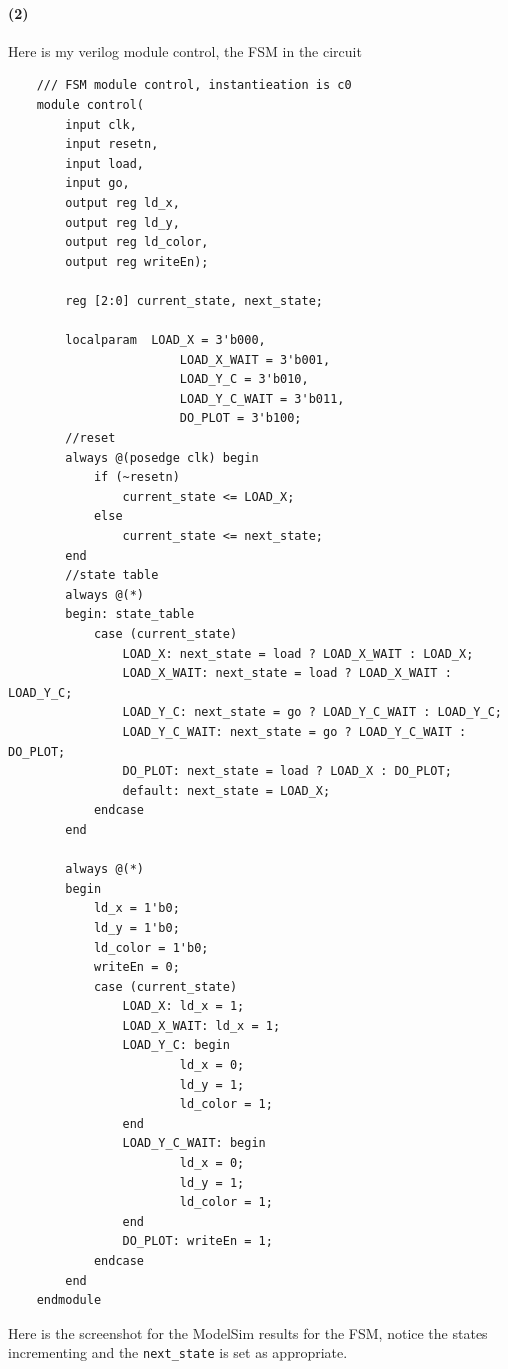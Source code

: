 \documentclass{article}
\begin{document}
\paragraph{(2)} Here is my verilog module control, the FSM in the circuit
\begin{verbatim}
    /// FSM module control, instantieation is c0
    module control(
        input clk, 
        input resetn, 
        input load, 
        input go,
        output reg ld_x, 
        output reg ld_y, 
        output reg ld_color, 
        output reg writeEn);

        reg [2:0] current_state, next_state;

        localparam  LOAD_X = 3'b000,
                        LOAD_X_WAIT = 3'b001,
                        LOAD_Y_C = 3'b010,
                        LOAD_Y_C_WAIT = 3'b011,
                        DO_PLOT = 3'b100;
        //reset
        always @(posedge clk) begin
            if (~resetn)
                current_state <= LOAD_X;
            else
                current_state <= next_state;
        end
        //state table
        always @(*) 
        begin: state_table
            case (current_state)
                LOAD_X: next_state = load ? LOAD_X_WAIT : LOAD_X;
                LOAD_X_WAIT: next_state = load ? LOAD_X_WAIT : LOAD_Y_C;
                LOAD_Y_C: next_state = go ? LOAD_Y_C_WAIT : LOAD_Y_C;
                LOAD_Y_C_WAIT: next_state = go ? LOAD_Y_C_WAIT : DO_PLOT;
                DO_PLOT: next_state = load ? LOAD_X : DO_PLOT;
                default: next_state = LOAD_X;
            endcase
        end

        always @(*)
        begin
            ld_x = 1'b0;
            ld_y = 1'b0;
            ld_color = 1'b0;
            writeEn = 0;
            case (current_state)
                LOAD_X: ld_x = 1;
                LOAD_X_WAIT: ld_x = 1;
                LOAD_Y_C: begin
                        ld_x = 0;
                        ld_y = 1;
                        ld_color = 1;
                end
                LOAD_Y_C_WAIT: begin
                        ld_x = 0;
                        ld_y = 1;
                        ld_color = 1;
                end
                DO_PLOT: writeEn = 1;
            endcase
        end
    endmodule
\end{verbatim}
Here is the screenshot for the ModelSim results for the FSM, notice the states incrementing and the \texttt{next\_state} is set as appropriate.
\end{document}
